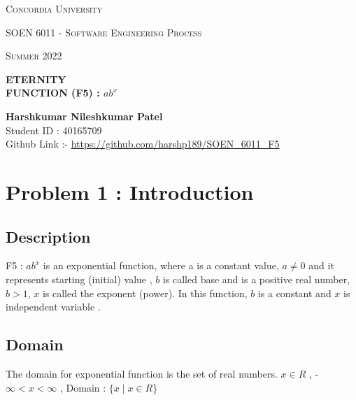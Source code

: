 \documentclass[12pt, a4paper]{article}
\begin{document}
\begin{titlepage}
	\centering
	\vspace*{0.5 cm}
	\begin{center}    \textsc{\Large Concordia University}\\[2.0 cm]	\end{center}
	\textsc{\Large  SOEN 6011 - Software Engineering Process }\\[0.5 cm]
	\begin{center} \textsc{\Large Summer 2022} \end{center}
	
	\vspace{15mm}
	
	{ \huge \textbf {ETERNITY}}\\[0.2 cm]
	{ \large \textbf{FUNCTION (F5) : $ab^x$}}
	
	\vspace{90mm}	
	\begin{center}   
		{\large \textbf{Harshkumar Nileshkumar Patel}  }\\[0.2 cm]
		{\large Student ID : 40165709 }\\[0.2 cm]
		\vspace{10mm}
		{\large Github Link :- \url{https://github.com/harshp189/SOEN\_6011\_F5}}
	\end{center}
		
\end{titlepage}
\tableofcontents
\newpage

\section{Problem 1 : Introduction}
\subsection{Description}

F5 : $ab^x$ is an exponential function, where a is a constant value, $a \ne 0$ and it represents starting (initial) value , $b$ is called base and is a positive real number, $b > 1$, $x$ is called the exponent (power). In this function, $b$ is a constant and $x$ is  independent variable \cite{Exponential Growth and Decay}.

\subsection{Domain}

The domain for exponential function is the set of real numbers. 
\newline $ x \in R $ ,  -$ \infty < x <\infty $ , Domain : $ \{x \mid x \in R $\}
\end{document}
